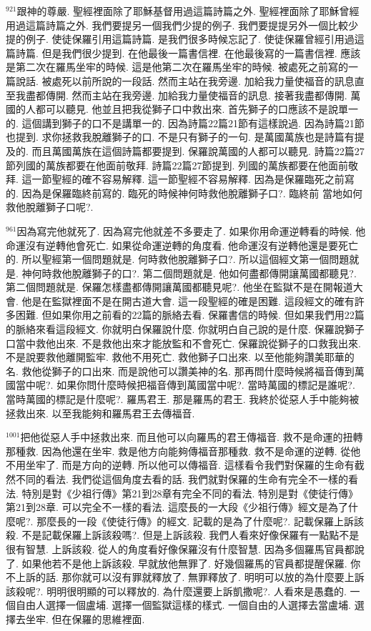 \documentclass{book}
\begin{document}
$^{921}$跟神的尊嚴.
聖經裡面除了耶穌基督用過這篇詩篇之外.
聖經裡面除了耶穌曾經用過這篇詩篇之外.
我們要提另一個我們少提的例子.
我們要提提另外一個比較少提的例子.
使徒保羅引用這篇詩篇.
是我們很多時候忘記了.
使徒保羅曾經引用過這篇詩篇.
但是我們很少提到.
在他最後一篇書信裡.
在他最後寫的一篇書信裡.
應該是第二次在羅馬坐牢的時候.
這是他第二次在羅馬坐牢的時候.
被處死之前寫的一篇說話.
被處死以前所說的一段話.
然而主站在我旁邊.
加給我力量使福音的訊息直至我盡都傳開.
然而主站在我旁邊.
加給我力量使福音的訊息.
接著我盡都傳開.
萬國的人都可以聽見.
他並且把我從獅子口中救出來.
首先獅子的口應該不是說單一的.
這個講到獅子的口不是講單一的.
因為詩篇22篇21節有這樣說過.
因為詩篇21節也提到.
求你拯救我脫離獅子的口.
不是只有獅子的一句.
是萬國萬族也是詩篇有提及的.
而且萬國萬族在這個詩篇都要提到.
保羅說萬國的人都可以聽見.
詩篇22篇27節列國的萬族都要在他面前敬拜.
詩篇22篇27節提到.
列國的萬族都要在他面前敬拜.
這一節聖經的確不容易解釋.
這一節聖經不容易解釋.
因為是保羅臨死之前寫的.
因為是保羅臨終前寫的.
臨死的時候神何時救他脫離獅子口?.
臨終前 當地如何救他脫離獅子口呢?.

$^{961}$因為寫完他就死了.
因為寫完他就差不多要走了.
如果你用命運逆轉看的時候.
他命運沒有逆轉他會死亡.
如果從命運逆轉的角度看.
他命運沒有逆轉他還是要死亡的.
所以聖經第一個問題就是.
何時救他脫離獅子口?.
所以這個經文第一個問題就是.
神何時救他脫離獅子的口?.
第二個問題就是.
他如何盡都傳開讓萬國都聽見?.
第二個問題就是.
保羅怎樣盡都傳開讓萬國都聽見呢?.
他坐在監獄不是在開報道大會.
他是在監獄裡面不是在開古道大會.
這一段聖經的確是困難.
這段經文的確有許多困難.
但如果你用之前看的22篇的脈絡去看.
保羅書信的時候.
但如果我們用22篇的脈絡來看這段經文.
你就明白保羅說什麼.
你就明白自己說的是什麼.
保羅說獅子口當中救他出來.
不是救他出來才能放監和不會死亡.
保羅說從獅子的口救我出來.
不是說要救他離開監牢.
救他不用死亡.
救他獅子口出來.
以至他能夠讚美耶華的名.
救他從獅子的口出來.
而是說他可以讚美神的名.
那再問什麼時候將福音傳到萬國當中呢?.
如果你問什麼時候把福音傳到萬國當中呢?.
當時萬國的標記是誰呢?.
當時萬國的標記是什麼呢?.
羅馬君王.
那是羅馬的君王.
我終於從惡人手中能夠被拯救出來.
以至我能夠和羅馬君王去傳福音.

$^{1001}$把他從惡人手中拯救出來.
而且他可以向羅馬的君王傳福音.
救不是命運的扭轉那種救.
因為他還在坐牢.
救是他方向能夠傳福音那種救.
救不是命運的逆轉.
從他不用坐牢了.
而是方向的逆轉.
所以他可以傳福音.
這樣看令我們對保羅的生命有截然不同的看法.
我們從這個角度去看的話.
我們就對保羅的生命有完全不一樣的看法.
特別是對《少祖行傳》第21到28章有完全不同的看法.
特別是對《使徒行傳》第21到28章.
可以完全不一樣的看法.
這麼長的一大段《少祖行傳》經文是為了什麼呢?.
那麼長的一段《使徒行傳》的經文.
記載的是為了什麼呢?.
記載保羅上訴該殺.
不是記載保羅上訴該殺嗎?.
但是上訴該殺.
我們人看來好像保羅有一點點不是很有智慧.
上訴該殺.
從人的角度看好像保羅沒有什麼智慧.
因為多個羅馬官員都說了.
如果他若不是他上訴該殺.
早就放他無罪了.
好幾個羅馬的官員都提醒保羅.
你不上訴的話.
那你就可以沒有罪就釋放了.
無罪釋放了.
明明可以放的為什麼要上訴該殺呢?.
明明很明顯的可以釋放的.
為什麼還要上訴凱撒呢?.
人看來是愚蠢的.
一個自由人選擇一個盧埔.
選擇一個監獄這樣的樣式.
一個自由的人選擇去當盧埔.
選擇去坐牢.
但在保羅的思維裡面.
\end{document}
